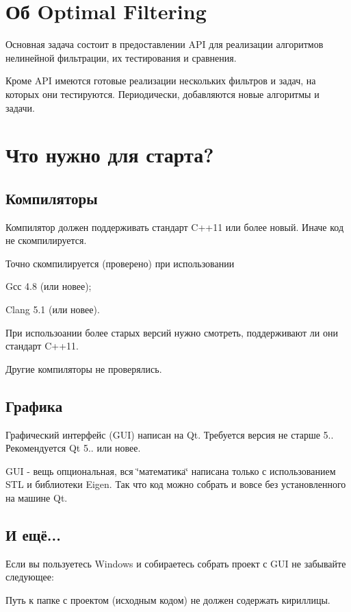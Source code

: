 \hypertarget{index_intro_sec}{}\section{Об Optimal Filtering}\label{index_intro_sec}
Основная задача состоит в предоставлении A\+PI для реализации алгоритмов нелинейной фильтрации, их тестирования и сравнения.

Кроме A\+PI имеются готовые реализации нескольких фильтров и задач, на которых они тестируются. Периодически, добавляются новые алгоритмы и задачи.\hypertarget{index_for_compile}{}\section{Что нужно для старта?}\label{index_for_compile}
\hypertarget{index_compilers}{}\subsection{Компиляторы}\label{index_compilers}
Компилятор должен поддерживать стандарт C++11 или более новый. Иначе код не скомпилируется.

Точно скомпилируется (проверено) при использовании \begin{DoxyVerb}  Gсс 4.8 (или новее);

  Clang 5.1 (или новее).
\end{DoxyVerb}


При использоании более старых версий нужно смотреть, поддерживают ли они стандарт C++11.

Другие компиляторы не проверялись.\hypertarget{index_gui}{}\subsection{Графика}\label{index_gui}
Графический интерфейс (G\+UI) написан на Qt. Требуется версия не старше 5.. Рекомендуется Qt 5.. или новее.

G\+UI -\/ вещь опциональная, вся \char`\"{}математика\char`\"{} написана только с использованием S\+TL и библиотеки Eigen. Так что код можно собрать и вовсе без установленного на машине Qt.\hypertarget{index_qt_bugs}{}\subsection{И ещё...}\label{index_qt_bugs}
Если вы пользуетесь Windows и собираетесь собрать проект с G\+UI не забывайте следующее\+:

Путь к папке с проектом (исходным кодом) не должен содержать кириллицы.


